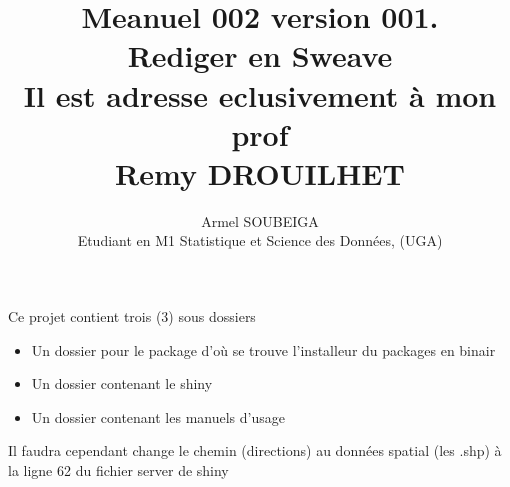 \documentclass[a4paper]{article}
\begin{document}


\title{Meanuel 002 version 001.\\ Rediger en Sweave \\Il est adresse eclusivement à mon prof\\ Remy DROUILHET}
\author{Armel SOUBEIGA \\ Etudiant en M1 Statistique et Science des Données, (UGA)}

\maketitle
Ce projet contient trois (3) sous dossiers
\begin{itemize}%
\item Un dossier pour le package d'où se trouve l'installeur du packages en binair
\item Un dossier contenant le shiny
\item Un dossier contenant les manuels d'usage
\end{itemize}
Il faudra cependant change le chemin (directions) au données spatial (les .shp) à la ligne 62 du fichier server de shiny
\end{document}
